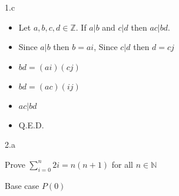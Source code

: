 \documentclass[12pt]{article}
\begin{document}
{\large 1.c \par}

\begin{itemize}

\item Let $a, b, c, d \in \mathbb{Z}$. If $a | b$ and $c | d$ then $ac|bd$.
\item Since $ a | b $ then $b = ai$, Since $c | d$ then $d = cj$ 
\item $bd = (ai)(cj)$
\item $bd = (ac)(ij)$
\item $ac | bd$
\item Q.E.D.



\end{itemize}


{\large 2.a \par}


Prove $\sum^{n}_{i=0}2i = n(n+1)$ for all $n \in \mathbb{N}$


Base case $P(0)$
\end{document}
